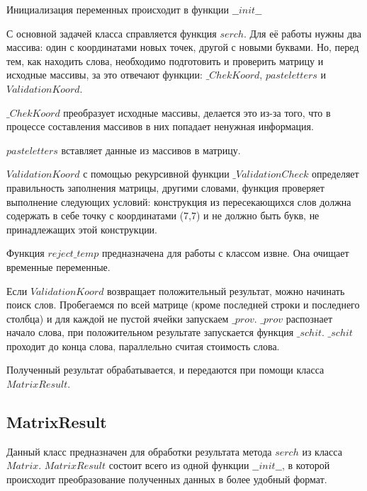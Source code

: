 \documentclass[a4paper,14pt]{article}
\begin{document}
	Инициализация переменных происходит в функции $\_\_init\_\_$
	
	С основной задачей класса справляется функция $serch$. Для её работы нужны два массива: один с координатами новых точек, другой с новыми буквами. Но, перед тем, как находить слова, необходимо подготовить и проверить матрицу и исходные массивы, за это отвечают функции: $\_ChekKoord$, $pasteletters$ и $ValidationKoord$.
	
	$\_ChekKoord$ преобразует исходные массивы, делается это из-за того, что в процессе составления массивов в них попадает ненужная информация.
	
	$pasteletters$ вставляет данные из массивов в матрицу.
	
	$ValidationKoord$ с помощью рекурсивной функции $\_ValidationCheck$ определяет правильность заполнения матрицы, другими словами, функция проверяет выполнение следующих условий: конструкция из пересекающихся слов должна содержать в себе точку с координатами (7,7) и не должно быть букв, не принадлежащих этой конструкции.
	
	Функция $reject\_temp$ предназначена для работы с классом извне. Она очищает временные переменные.  
	
	Если $ValidationKoord$ возвращает положительный результат, можно начинать поиск слов. Пробегаемся по всей матрице (кроме последней строки и последнего столбца) и для каждой не пустой ячейки запускаем $\_prov$. $\_prov$ распознает начало слова, при положительном результате запускается функция $\_schit$. $\_schit$ проходит до конца слова, параллельно считая стоимость слова.
	
	Полученный результат обрабатывается, и передаются при помощи класса $MatrixResult$.
	
	\subsection{MatrixResult}
	Данный класс предназначен для обработки результата метода $serch$ из класса $Matrix$. $MatrixResult$ состоит всего из одной функции $\_\_init\_\_$, в которой происходит преобразование полученных данных в более удобный формат. 
\end{document}
